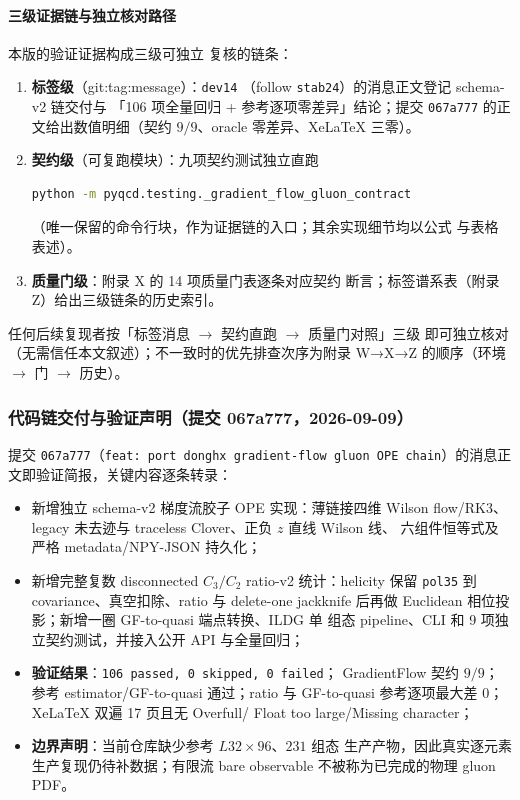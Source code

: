 \documentclass[11pt,a4paper]{ctexart}
\newcommand{\code}[1]{\texttt{#1}}
\begin{document}
\paragraph{三级证据链与独立核对路径}本版的验证证据构成三级可独立
复核的链条：
\begin{enumerate}
  \item \textbf{标签级}（git:tag:message）：\code{dev14}
  （follow \code{stab24}）的消息正文登记 schema-v2 链交付与
  「106 项全量回归 + 参考逐项零差异」结论；提交 \code{067a777}
  的正文给出数值明细（契约 $9/9$、oracle 零差异、XeLaTeX 三零）。
  \item \textbf{契约级}（可复跑模块）：九项契约测试独立直跑
  \begin{lstlisting}[language=bash, numbers=none]
python -m pyqcd.testing._gradient_flow_gluon_contract
  \end{lstlisting}
  （唯一保留的命令行块，作为证据链的入口；其余实现细节均以公式
  与表格表述）。
  \item \textbf{质量门级}：附录 X 的 14 项质量门表逐条对应契约
  断言；标签谱系表（附录 Z）给出三级链条的历史索引。
\end{enumerate}
任何后续复现者按「标签消息 $\to$ 契约直跑 $\to$ 质量门对照」三级
即可独立核对（无需信任本文叙述）；不一致时的优先排查次序为附录
W→X→Z 的顺序（环境 $\to$ 门 $\to$ 历史）。

\subsubsection{代码链交付与验证声明（提交 067a777，2026-09-09）}

提交 \code{067a777}（\code{feat: port donghx gradient-flow gluon OPE
chain}）的消息正文即验证简报，关键内容逐条转录：

\begin{itemize}
  \item 新增独立 schema-v2 梯度流胶子 OPE 实现：薄链接四维 Wilson
  flow/RK3、legacy 未去迹与 traceless Clover、正负 $z$ 直线 Wilson 线、
  六组件恒等式及严格 metadata/NPY-JSON 持久化；
  \item 新增完整复数 disconnected $C_3/C_2$ ratio-v2 统计：helicity 保留
  \code{pol35} 到 covariance、真空扣除、ratio 与 delete-one jackknife
  后再做 Euclidean 相位投影；新增一圈 GF-to-quasi 端点转换、ILDG 单
  组态 pipeline、CLI 和 9 项独立契约测试，并接入公开 API 与全量回归；
  \item \textbf{验证结果}：\code{106 passed, 0 skipped, 0 failed}；
  GradientFlow 契约 $9/9$；参考 estimator/GF-to-quasi 通过；ratio 与
  GF-to-quasi 参考逐项最大差 $0$；XeLaTeX 双遍 17 页且无 Overfull/
  Float too large/Missing character；
  \item \textbf{边界声明}：当前仓库缺少参考 $L32\times96$、$231$ 组态
  生产产物，因此真实逐元素生产复现仍待补数据；有限流 bare observable
  不被称为已完成的物理 gluon PDF。
\end{itemize}
\end{document}
